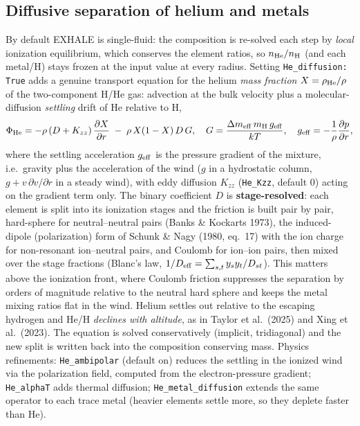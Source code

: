 \documentclass[english,a4paper]{my_memo}
\begin{document}
\subsection{Diffusive separation of helium and metals}\label{sec:hediff}
By default EXHALE is single-fluid: the composition is re-solved each step by
\emph{local} ionization equilibrium, which conserves the element ratios, so
$n_{\rm He}/n_{\rm H}$ (and each metal/H) stays frozen at the input value at
every radius. Setting \texttt{He\_diffusion: True} adds a genuine transport
equation for the helium \emph{mass fraction} $X=\rho_{\rm He}/\rho$ of the
two-component H/He gas: advection at the bulk velocity plus a
molecular-diffusion \emph{settling} drift of He relative to H,
\[
  \Phi_{\rm He} = -\rho\,(D+K_{zz})\,\frac{\partial X}{\partial r}
                  \;-\; \rho\,X(1-X)\,D\,G,
  \quad G=\frac{\Delta m_{\rm eff}\,m_{\rm H}\,g_{\rm eff}}{k T},
  \quad g_{\rm eff} = -\frac{1}{\rho}\frac{\partial p}{\partial r},
\]
where the settling acceleration $g_{\rm eff}$ is the pressure gradient of the
mixture, i.e.\ gravity plus the acceleration of the wind ($g$ in a hydrostatic
column, $g+v\,\partial v/\partial r$ in a steady wind), with eddy diffusion $K_{zz}$ (\texttt{He\_Kzz}, default 0) acting on the
gradient term only. The binary coefficient $D$ is \textbf{stage-resolved}: each
element is split into its ionization stages and the friction is built pair by
pair, hard-sphere for neutral--neutral pairs (Banks \& Kockarts 1973), the
induced-dipole (polarization) form of Schunk \& Nagy (1980, eq.~17) with the
ion charge for non-resonant ion--neutral pairs, and Coulomb for ion--ion pairs, then mixed over the stage fractions
(Blanc's law, $1/D_{\rm eff}=\sum_{s,t} y_sy_t/D_{st}$). This matters above the
ionization front, where Coulomb friction suppresses the separation by orders of
magnitude relative to the neutral hard sphere and keeps the metal mixing ratios
flat in the wind. Helium settles out relative to the escaping hydrogen and He/H
\emph{declines with altitude}, as in Taylor et al.\ (2025) and Xing et al.\
(2023). The equation is solved conservatively (implicit, tridiagonal) and the
new split is written back into the composition conserving mass. Physics
refinements: \texttt{He\_ambipolar} (default on) reduces the settling in the
ionized wind via the polarization field, computed from the electron-pressure
gradient; \texttt{He\_alphaT} adds thermal diffusion;
\texttt{He\_metal\_diffusion} extends the same operator to each trace metal
(heavier elements settle more, so they deplete faster than He).
\end{document}
